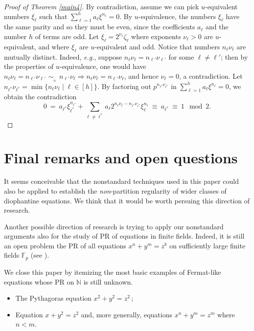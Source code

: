 \documentclass[11pt]{amsart}
\theoremstyle{definition}
\theoremstyle{remark}
\numberwithin{equation}{section}
\begin{document}
\medskip
\begin{proof}[Proof of Theorem \ref{main4}]
By contradiction, assume we can pick $u$-equivalent
numbers $\xi_\ell$ such that
$\sum_{\ell=1}^h a_\ell \xi^{n_\ell}=0$.
By $u$-equivalence, the numbers $\xi_\ell$
have the same parity and so they must be even,
since the coefficients $a_\ell$ and the number $h$ of terms are odd. 
Let $\xi_\ell=2^{\nu_\ell}\zeta_\ell$
where exponents $\nu_\ell>0$ are $u$-equivalent,
and where $\xi_\ell$ are $u$-equivalent and odd.
Notice that numbers $n_\ell\nu_\ell$ are mutually distinct.
Indeed, \emph{e.g.}, suppose 
$n_\ell\nu_\ell=n_{\ell'}\nu_{\ell'}$ for some $\ell\ne\ell'$; 
then by the properties of $u$-equivalence,
one would have 
$n_\ell\nu_\ell=n_{\ell'}\nu_{\ell'}\,{{\,{\sim}_{{}_{\!\!\!\!\! u}}\;}}\,n_{\ell'}\nu_\ell
\Rightarrow n_\ell\nu_\ell=n_{\ell'}\nu_\ell$,
and hence $\nu_\ell=0$, a contradiction.
Let $n_{\ell^*}\nu_{\ell^*}=\min\{n_\ell\nu_\ell\mid \ell\in[h]\}$.
By factoring out $p^{n_{\ell^*}\nu_{\ell^*}}$ in
$\sum_{\ell=1}^h a_\ell \xi^{n_\ell}=0$, we obtain the contradiction
$$0\ =\ a_{\ell^*} \xi_{\ell^*}^{n_{\ell^*}}+
\sum_{\ell\ne\ell^*}
a_\ell 2^{n_\ell\nu_{\ell}-n_{\ell^*}\nu_{\ell^*}}\xi_\ell^{n_\ell}\ 
\equiv\ a_{\ell^*}\ \equiv\ 1\mod 2.$$
\end{proof}

\section{Final remarks and open questions}

It seems conceivable that the nonstandard techniques
used in this paper could also be applied to
establish the \emph{non}-partition regularity
of wider classes of diophantine equations.
We think that it would be worth persuing
this direction of research.

Another possible direction of research is 
trying to apply our nonstandard arguments
also for the study of PR of equations
in finite fields. Indeed,
it is still an open 
problem the PR of all equations $x^n+y^m=z^k$ on
sufficiently large finite fields $\mathbb{F}_p$
(see \cite{CGS12}).

\smallskip
We close this paper by itemizing the most basic
examples of Fermat-like equations whose
PR on ${\mathbb{N}}$ is still unknown.

\smallskip
\begin{itemize}
\item 
The Pythagoras equation $x^2+y^2=z^2$\,;

\smallskip
\item 
Equation $x+y^2=z^2$ and, more generally,
equations $x^n+y^m=z^m$ where $n<m$.
\end{itemize}
\end{document}
